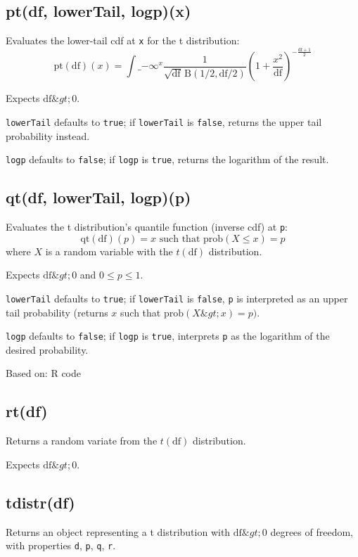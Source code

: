 \documentclass{article}
\begin{document}
    \subsection*{pt(df, lowerTail, logp)(x)}
    Evaluates the lower-tail cdf at \texttt{x} for the t distribution:
$$\textrm{pt}(\textrm{df})(x) = \int\_{-\infty}^{x} \frac{1}{\sqrt{\textrm{df}}\,\textrm{B}(1/2, \textrm{df}/2)} \left(1+\frac{x^2}{\textrm{df}} \right)^{-\frac{\textrm{df} + 1}{2}}$$


Expects $\textrm{df} \&gt; 0$.


\texttt{lowerTail} defaults to \texttt{true}; if \texttt{lowerTail} is \texttt{false}, returns
the upper tail probability instead.


\texttt{logp} defaults to \texttt{false}; if \texttt{logp} is \texttt{true}, returns the logarithm
of the result.


    \subsection*{qt(df, lowerTail, logp)(p)}
    Evaluates the t distribution's quantile function
(inverse cdf) at \texttt{p}:
$$\textrm{qt}(\textrm{df})(p) = x \textrm{ such that } \textrm{prob}(X \leq x) = p$$
where $X$ is a random variable with the $t(\textrm{df})$ distribution.


Expects $\textrm{df} \&gt; 0$ and $0 \leq p \leq 1$.


\texttt{lowerTail} defaults to \texttt{true}; if \texttt{lowerTail} is \texttt{false}, \texttt{p} is
interpreted as an upper tail probability (returns
$x$ such that $\textrm{prob}(X \&gt; x) = p)$.


\texttt{logp} defaults to \texttt{false}; if \texttt{logp} is \texttt{true}, interprets \texttt{p} as
the logarithm of the desired probability.


Based on: R code


    \subsection*{rt(df)}
    Returns a random variate from the $t(\textrm{df})$ distribution.


Expects $\textrm{df} \&gt; 0$.


    \subsection*{tdistr(df)}
    Returns an object representing a t distribution with $\textrm{df} \&gt; 0$
degrees of freedom, with properties \texttt{d}, \texttt{p}, \texttt{q}, \texttt{r}.
\end{document}
